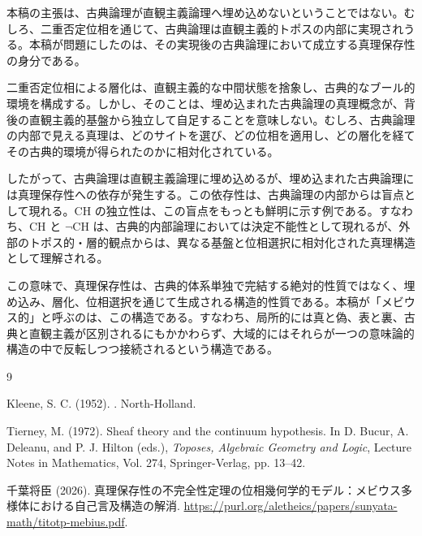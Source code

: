 \documentclass[11pt]{ltjsarticle}
\begin{document}
本稿の主張は、古典論理が直観主義論理へ埋め込めないということではない。むしろ、二重否定位相を通じて、古典論理は直観主義的トポスの内部に実現されうる。本稿が問題にしたのは、その実現後の古典論理において成立する真理保存性の身分である。

二重否定位相による層化は、直観主義的な中間状態を捨象し、古典的なブール的環境を構成する。しかし、そのことは、埋め込まれた古典論理の真理概念が、背後の直観主義的基盤から独立して自足することを意味しない。むしろ、古典論理の内部で見える真理は、どのサイトを選び、どの位相を適用し、どの層化を経てその古典的環境が得られたのかに相対化されている。

したがって、古典論理は直観主義論理に埋め込めるが、埋め込まれた古典論理には真理保存性への依存が発生する。この依存性は、古典論理の内部からは盲点として現れる。CH の独立性は、この盲点をもっとも鮮明に示す例である。すなわち、CH と $\neg\mathrm{CH}$ は、古典的内部論理においては決定不能性として現れるが、外部のトポス的・層的観点からは、異なる基盤と位相選択に相対化された真理構造として理解される。

この意味で、真理保存性は、古典的体系単独で完結する絶対的性質ではなく、埋め込み、層化、位相選択を通じて生成される構造的性質である。本稿が「メビウス的」と呼ぶのは、この構造である。すなわち、局所的には真と偽、表と裏、古典と直観主義が区別されるにもかかわらず、大域的にはそれらが一つの意味論的構造の中で反転しつつ接続されるという構造である。

\begin{thebibliography}{9}

Kleene, S. C. (1952).
.
\newblock North-Holland.

Tierney, M. (1972).
\newblock Sheaf theory and the continuum hypothesis.
\newblock In D. Bucur, A. Deleanu, and P. J. Hilton (eds.), {\itshape Toposes, Algebraic Geometry and Logic}, Lecture Notes in Mathematics, Vol. 274, Springer-Verlag, pp. 13--42.

千葉将臣 (2026).
\newblock 真理保存性の不完全性定理の位相幾何学的モデル：メビウス多様体における自己言及構造の解消.
\newblock \url{https://purl.org/aletheics/papers/sunyata-math/titotp-mebius.pdf}.

\end{thebibliography}
\end{document}
